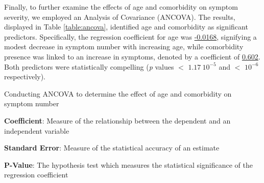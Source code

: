 \documentclass[11pt]{article}
\begin{document}
Finally, to further examine the effects of age and comorbidity on symptom severity, we employed an Analysis of Covariance (ANCOVA). The results, displayed in Table \ref{table:ancova}, identified age and comorbidity as significant predictors. Specifically, the regression coefficient for age was \hyperlink{C1a}{-0.0168}, signifying a modest decrease in symptom number with increasing age, while comorbidity presence was linked to an increase in symptoms, denoted by a coefficient of \hyperlink{C2a}{0.602}. Both predictors were statistically compelling (\textit{p} values $<$ \hyperlink{C1c}{$1.17\ 10^{-5}$} and $<$ \hyperlink{C2c}{$10^{-6}$} respectively).

\begin{table}[h]
\caption{\protect\hyperlink{file-table-2-pkl}{ANCOVA of symptom number on age and comorbidity}}
\label{table:ancova}
\begin{threeparttable}
\renewcommand{\TPTminimum}{\linewidth}
\begin{tablenotes}
\footnotesize
\item Conducting ANCOVA to determine the effect of age and comorbidity on symptom number
\item \textbf{Coefficient}: Measure of the relationship between the dependent and an independent variable
\item \textbf{Standard Error}: Measure of the statistical accuracy of an estimate
\item \textbf{P-Value}: The hypothesis test which measures the statistical significance of the regression coefficient
\end{tablenotes}
\end{threeparttable}
\end{table}
\end{document}

